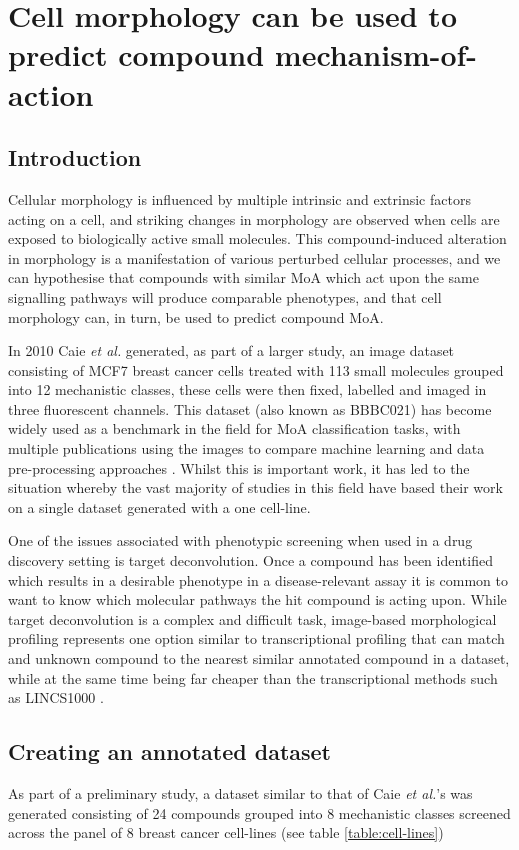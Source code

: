 \documentclass[a4paper,11pt,twoside,openright]{scrbook}
\begin{document}
\chapter{Cell morphology can be used to predict compound mechanism-of-action} \label{chapter:moa}

\section{Introduction}
Cellular morphology is influenced by multiple intrinsic and extrinsic factors acting on a cell, and striking changes in morphology are observed when cells are exposed to biologically active small molecules.
This compound-induced alteration in morphology is a manifestation of various perturbed cellular processes, and we can hypothesise that compounds with similar MoA which act upon the same signalling pathways will produce comparable phenotypes, and that cell morphology can, in turn, be used to predict compound MoA.

In 2010 Caie \textit{et al.} generated, as part of a larger study, an image dataset consisting of MCF7 breast cancer cells treated with 113 small molecules grouped into 12 mechanistic classes, these cells were then fixed, labelled and imaged in three fluorescent channels\cite{Caie2010}.
This dataset (also known as BBBC021) has become widely used as a benchmark in the field for MoA classification tasks, with multiple publications using the images to compare machine learning and data pre-processing approaches \cite{Ljosa2013a,Singh2014a,Pawlowski2016,Ando2017}.
Whilst this is important work, it has led to the situation whereby the vast majority of studies in this field have based their work on a single dataset generated with a one cell-line.

One of the issues associated with phenotypic screening when used in a drug discovery setting is target deconvolution.
Once a compound has been identified which results in a desirable phenotype in a disease-relevant assay it is common to want to know which molecular pathways the hit compound is acting upon.
While target deconvolution is a complex and difficult task, image-based morphological profiling represents one option similar to transcriptional profiling that can match and unknown compound to the nearest similar annotated compound in a dataset, while at the same time being far cheaper than the transcriptional methods such as LINCS1000 \cite{Duan2014}.


\section{Creating an annotated dataset}
%
As part of a preliminary study, a dataset similar to that of Caie \textit{et al.}'s was generated consisting of 24 compounds grouped into 8 mechanistic classes screened across the panel of 8 breast cancer cell-lines (see table \ref{table:cell-lines})
\end{document}

